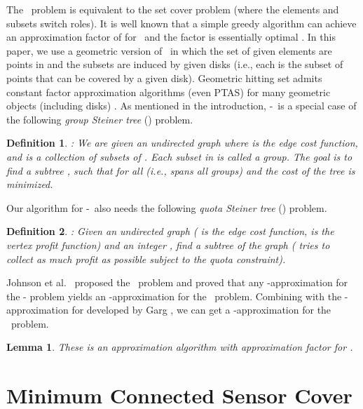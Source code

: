 \documentclass[11pt]{article}
\newcommand{\mincsc}{-}
\newcommand{\bcsc}{-}
\newcommand{\qst}{}
\newcommand{\gst}{}
\newcommand{\hittingset}{}
\newtheorem{lemma}{Lemma}
\newtheorem{definition}{Definition}
\begin{document}
The \hittingset\ problem is equivalent to the set cover problem (where the elements and subsets switch roles).
It is well known that a simple greedy algorithm
can achieve an approximation factor of  for \hittingset\
and the factor is essentially optimal \cite{feige1998threshold,dinur2014analytical}.
In this paper, we use a geometric version of \hittingset\ in which
the set of given elements are points in  and the subsets are
induced by given disks (i.e., each  is the subset of points that can be covered by
a given disk). Geometric hitting set admits constant factor approximation algorithms (even PTAS)
for many geometric objects (including disks) \cite{bronnimann1995almost,Clarkson,mustafa2009ptas,varadarajan2010weighted,Chan2012}.
As mentioned in the introduction, \mincsc\ is a special case of
the following {\em group Steiner tree} (\gst) problem.

\begin{definition}
	\gst: We are given an undirected graph 
	where  is the edge cost function,
	and  is a collection of subsets of .
	Each subset in  is called a group.
The goal is to find a subtree , such that
	 for all  (i.e.,  spans all groups)
	and the cost of the tree  is minimized.
\end{definition}

Our algorithm for \bcsc\ also needs the following {\em quota Steiner tree} (\qst) problem.

\begin{definition}
	\qst: Given an undirected graph 
	( is the edge cost function,
	 is the vertex profit function) and an integer ,
find a subtree  of the graph 
	( tries to collect as much profit as possible subject to the quota constraint).
\end{definition}


Johnson et al.~\cite{johnson2000prize} proposed the \qst\ problem and proved that any -approximation for the - problem yields an -approximation for the \qst\ problem.
Combining with the -approximation for  developed by Garg \cite{garg2005saving},
we can get a -approximation for the \qst\ problem.
\begin{lemma}
	\label{lm:qst}
	These is an  approximation algorithm with approximation factor 
	for \qst.
\end{lemma}



\section{Minimum Connected Sensor Cover}
\label{sec:mscs}
\end{document}
